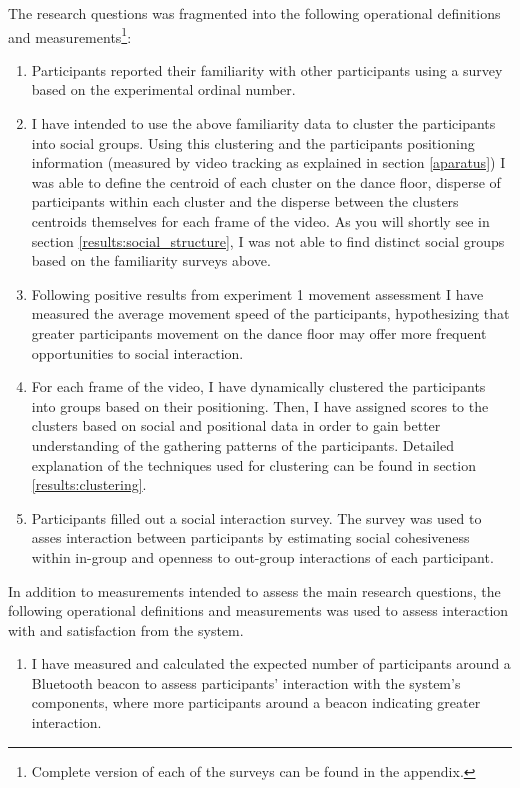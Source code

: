 \documentclass[a4paper,11pt]{article}
\begin{document}
{The research questions was fragmented into the following operational definitions and measurements\footnote{Complete version of each of the surveys can be found in the appendix.}:
\begin{enumerate}
	\item \label{measure:survey:familiarity} Participants reported their familiarity with other participants using a survey based on the experimental ordinal number.
	\item I have intended to use the above familiarity data to cluster the participants into social groups.
            Using this clustering and the participants positioning information (measured by video tracking as explained in section \ref{aparatus}) I was able to define the centroid of each cluster on the dance floor, disperse of participants within each cluster and the disperse between the clusters centroids themselves for each frame of the video.
            As you will shortly see in section \ref{results:social_structure}, I was not able to find distinct social groups based on the familiarity surveys above.
        \item \label{measure:movement} Following positive results from experiment 1 movement assessment I have measured the average movement speed of the participants, hypothesizing that greater participants movement on the dance floor may offer more frequent opportunities to social interaction.
        \item \label{measure:clustering} For each frame of the video, I have dynamically clustered the participants into groups based on their positioning.
            Then, I have assigned scores to the clusters based on social and positional data in order to gain better understanding of the gathering patterns of the participants.
            Detailed explanation of the techniques used for clustering can be found in section \ref{results:clustering}. 
	\item \label{measure:survey:social} Participants filled out a social interaction survey.
	The survey was used to asses interaction between participants by estimating social cohesiveness within in-group and openness to out-group interactions of each participant.
\end{enumerate}
In addition to measurements intended to assess the main research questions, the following operational definitions and measurements was used to assess interaction with and satisfaction from the system.
\begin{enumerate}[resume]
	\item \label{measure:system} I have measured and calculated the expected number of participants around a Bluetooth beacon to assess participants' interaction with the system's components, where more participants around a beacon indicating greater interaction.

\end{enumerate}}
\end{document}
